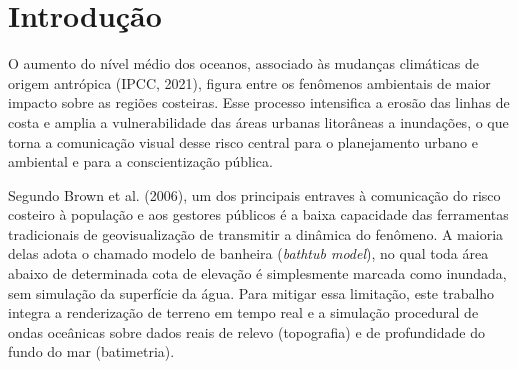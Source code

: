 \documentclass[conference]{IEEEtran}
\begin{document}
\begin{abstract}
\textit{Abstract}---This paper presents an interactive scientific
visualization system for analyzing coastal erosion and sea level rise
scenarios, built on a real Digital Elevation Model (DEM) of the Baixada
Santista region (Brazil).  The goal was to determine
experimentally the geometric load beyond which the adaptive level of detail
technique CDLOD (Continuous Distance-Dependent Level of Detail) becomes
indispensable to keep the application interactive on the tested desktop GPU. The ocean surface was modeled with
six Gerstner waves, with a base height adjustable in real time, which
allows sea level rise scenarios of 0, +0.5, +1 and +2 meters to be
visualized. An automated windowless benchmark, run on an NVIDIA RTX 3060
graphics processing unit (GPU), compared rendering with and without level
of detail at five terrain resolutions. The results indicate a tipping point near 4 million triangles (2.7 to 4.3 million, depending on the criterion and the run), beyond which CDLOD becomes faster than the full mesh. Frustum culling cut frame time by 22\% and moved the tipping point to about 2.3 million. It is concluded that adaptive level of detail is what
makes real-time three-dimensional visualization of coastal flooding
feasible.

Keywords: Scientific visualization. Level of detail. Terrain rendering.
Ocean simulation. Sea level rise.
\end{abstract}

\section{Introdução}
\label{sec:intro}

O aumento do nível médio dos oceanos, associado às mudanças climáticas de
origem antrópica (IPCC, 2021), figura entre os fenômenos ambientais de maior impacto
sobre as regiões costeiras. Esse processo intensifica a erosão das linhas de costa e amplia a vulnerabilidade das áreas urbanas litorâneas a inundações, o que torna a comunicação visual desse risco central para o planejamento urbano e ambiental e para a conscientização pública.

Segundo Brown et al. (2006), um dos principais entraves à comunicação do
risco costeiro à população e aos gestores públicos é a baixa capacidade
das ferramentas tradicionais de geovisualização de transmitir a dinâmica
do fenômeno. A maioria delas adota o chamado modelo de banheira
(\emph{bathtub model}), no qual toda área abaixo de determinada cota de
elevação é simplesmente marcada como inundada, sem simulação da
superfície da água. Para mitigar essa limitação, este trabalho integra a
renderização de terreno em tempo real e a simulação procedural de ondas
oceânicas sobre dados reais de relevo (topografia) e de profundidade do
fundo do mar (batimetria).
\end{document}

